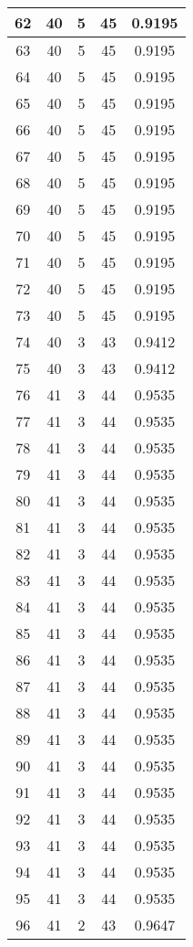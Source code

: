 \documentclass[letterpaper, 12pt]{article}
\begin{document}
\begin{longtable}{|c|c|c|c|c|}
\hline
62 & 40 & 5 & 45 & 0.9195 \\
\hline
63 & 40 & 5 & 45 & 0.9195 \\
\hline
64 & 40 & 5 & 45 & 0.9195 \\
\hline
65 & 40 & 5 & 45 & 0.9195 \\
\hline
66 & 40 & 5 & 45 & 0.9195 \\
\hline
67 & 40 & 5 & 45 & 0.9195 \\
\hline
68 & 40 & 5 & 45 & 0.9195 \\
\hline
69 & 40 & 5 & 45 & 0.9195 \\
\hline
70 & 40 & 5 & 45 & 0.9195 \\
\hline
71 & 40 & 5 & 45 & 0.9195 \\
\hline
72 & 40 & 5 & 45 & 0.9195 \\
\hline
73 & 40 & 5 & 45 & 0.9195 \\
\hline
74 & 40 & 3 & 43 & 0.9412 \\
\hline
75 & 40 & 3 & 43 & 0.9412 \\
\hline
76 & 41 & 3 & 44 & 0.9535 \\
\hline
77 & 41 & 3 & 44 & 0.9535 \\
\hline
78 & 41 & 3 & 44 & 0.9535 \\
\hline
79 & 41 & 3 & 44 & 0.9535 \\
\hline
80 & 41 & 3 & 44 & 0.9535 \\
\hline
81 & 41 & 3 & 44 & 0.9535 \\
\hline
82 & 41 & 3 & 44 & 0.9535 \\
\hline
83 & 41 & 3 & 44 & 0.9535 \\
\hline
84 & 41 & 3 & 44 & 0.9535 \\
\hline
85 & 41 & 3 & 44 & 0.9535 \\
\hline
86 & 41 & 3 & 44 & 0.9535 \\
\hline
87 & 41 & 3 & 44 & 0.9535 \\
\hline
88 & 41 & 3 & 44 & 0.9535 \\
\hline
89 & 41 & 3 & 44 & 0.9535 \\
\hline
90 & 41 & 3 & 44 & 0.9535 \\
\hline
91 & 41 & 3 & 44 & 0.9535 \\
\hline
92 & 41 & 3 & 44 & 0.9535 \\
\hline
93 & 41 & 3 & 44 & 0.9535 \\
\hline
94 & 41 & 3 & 44 & 0.9535 \\
\hline
95 & 41 & 3 & 44 & 0.9535 \\
\hline
96 & 41 & 2 & 43 & 0.9647 \\

\end{longtable}
\end{document}
